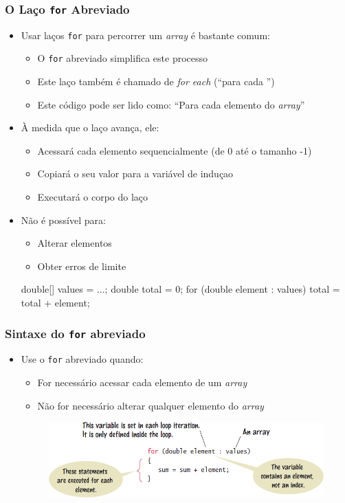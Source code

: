 \documentclass[xcolor={dvipsnames,table},aspectratio=169]{beamer}
\begin{document}
\begin{frame}[fragile]\frametitle{O Laço \texttt{for} Abreviado }
\begin{itemize}
	\item Usar laços \texttt{for} para percorrer um \emph{array} é bastante comum:
	\begin{itemize}
		\item O \texttt{for} abreviado simplifica este processo
		\item Este laço também é chamado de \emph{for each} (``para cada '')
		\item Este código pode ser lido como: ``Para cada elemento do \emph{array}''
	\end{itemize}
	\item À medida que o laço avança, ele:
	\begin{itemize}
		\item Acessará cada elemento sequencialmente (de 0 até o tamanho -1)
		\item Copiará o seu valor para a variável de induçao
		\item Executará o corpo do laço
	\end{itemize}
	\item Não é possível para:
	\begin{itemize}
		\item Alterar elementos
		\item Obter erros de limite
	\end{itemize}
{\scriptsize
\begin{javacode}
double[] values = ...;
double total = 0;
for (double element : values) {
  total = total + element;
}
\end{javacode}
}
\end{itemize}
\end{frame}

\begin{frame}\frametitle{Sintaxe do \texttt{for} abreviado }
\begin{itemize}
	\item Use o \texttt{for} abreviado quando:
	\begin{itemize}
		\item For necessário acessar cada elemento de um \emph{array}
		\item Não for necessário alterar qualquer elemento do \emph{array}
	\end{itemize}
\begin{figure}[h]
	\includegraphics[height=0.4\paperheight,center]{pucrs-ep-fprog-unidade_06-arrays-laminas-sintaxe_for_abreviado.png}
\end{figure}
\end{itemize}
\end{frame}
\end{document}
